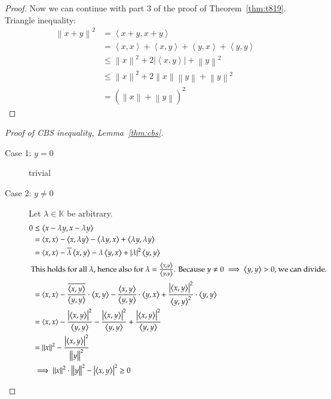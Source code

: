 \documentclass[a4paper]{article}
\numberwithin{lecref}{section}
\newcommand{\angel}[1]{\left\langle#1\right\rangle}
\newcommand{\norm}[1]{\left\|#1\right\|}
\newcommand{\card}[1]{\left|#1\right|}
\begin{document}
\begin{proof}
  Now we can continue with part 3 of the proof of Theorem~\ref{thm:t819}.
  Triangle inequality:
  \begin{align*}
    \norm{x + y}^2 &= \angel{x + y, x + y} \\
      &= \angel{x,x} + \angel{x,y} + \angel{y,x} + \angel{y,y} \\
      &\leq \norm{x}^2 + 2 \card{\angel{x, y}} + \norm{y}^2 \\
      &\leq \norm{x}^2 + 2 \norm{x} \norm{y} + \norm{y}^2 \\
      &= \left(\norm x + \norm y\right)^2
  \end{align*}
\end{proof}

\begin{proof}[Proof of CBS inequality, Lemma~\ref{thm:cbs}] \hfill{}
  \begin{description}
    \item[Case 1: $y = 0$] trivial
    \item[Case 2: $y \neq 0$]
      Let $\lambda \in \mathbb K$ be arbitrary.
      \begin{align*}
        0 &\leq \angel{x - \lambda y, x - \lambda y} \\
          &= \angel{x, x} - \angel{x, \lambda y} - \angel{\lambda y, x} + \angel{\lambda y, \lambda y} \\
          &= \angel{x, x} - \overline{\lambda} \angel{x,y} - \lambda \angel{y,x} + \card{\lambda}^2 \angel{y,y} \\
        \intertext{
          This holds for all $\lambda$, hence also for $\lambda = \frac{\angel{x,y}}{\angel{y,y}}$.
          Because $y \neq 0 \implies \angel{y,y} > 0$, we can divide.
        }
          &= \angel{x,x} - \frac{\overline{\angel{x,y}}}{\angel{y,y}} \cdot \angel{x,y} - \frac{\angel{x,y}}{\angel{y,y}} \cdot \angel{y,x} + \frac{\card{\angel{x,y}}^2}{\angel{y,y}^2} \cdot \angel{y,y} \\
          &= \angel{x,x} - \frac{\card{\angel{x,y}}^2}{\angel{y,y}} - \frac{\card{\angel{x,y}}^2}{\angel{y,y}} + \frac{\card{\angel{x,y}}^2}{\angel{y,y}} \\
          &= \norm{x}^2 - \frac{\card{\angel{x,y}}^2}{\norm{y}^2} \\
          &\implies \norm{x}^2 \cdot \norm{y}^2 - \card{\angel{x,y}}^2 \geq 0
      \end{align*}
  \end{description}
\end{proof}
\end{document}
